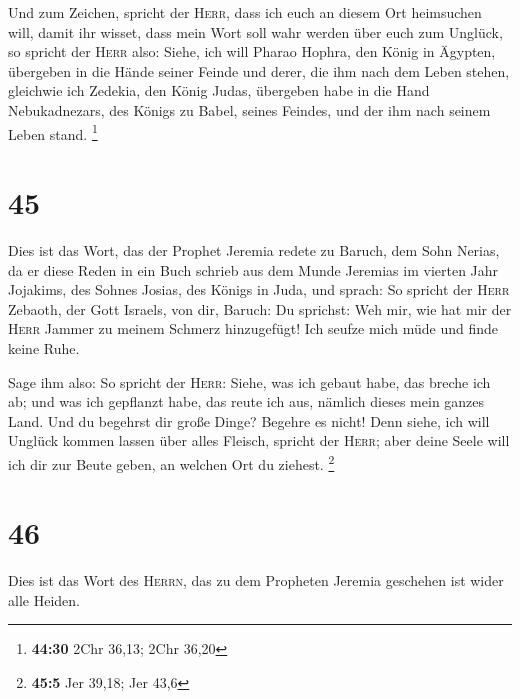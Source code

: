 Und zum Zeichen, spricht der \textsc{Herr}, dass ich
euch an diesem Ort heimsuchen will, damit ihr wisset, dass mein Wort
soll wahr werden über euch zum Unglück,  so spricht der
\textsc{Herr} also: Siehe, ich will Pharao Hophra, den König in Ägypten,
übergeben in die Hände seiner Feinde und derer, die ihm nach dem Leben
stehen, gleichwie ich Zedekia, den König Judas, übergeben habe in die
Hand Nebukadnezars, des Königs zu Babel, seines Feindes, und der ihm
nach seinem Leben stand. \footnote{\textbf{44:30} 2Chr 36,13; 2Chr 36,20}

\hypertarget{section-10}{%
\section{45}\label{section-10}}

 Dies ist das Wort, das der Prophet Jeremia redete zu
Baruch, dem Sohn Nerias, da er diese Reden in ein Buch schrieb aus dem
Munde Jeremias im vierten Jahr Jojakims, des Sohnes Josias, des Königs
in Juda, und sprach:  So spricht der \textsc{Herr}
Zebaoth, der Gott Israels, von dir, Baruch:  Du sprichst:
Weh mir, wie hat mir der \textsc{Herr} Jammer zu meinem Schmerz
hinzugefügt! Ich seufze mich müde und finde keine Ruhe.

 Sage ihm also: So spricht der \textsc{Herr}: Siehe, was
ich gebaut habe, das breche ich ab; und was ich gepflanzt habe, das
reute ich aus, nämlich dieses mein ganzes Land.  Und du
begehrst dir große Dinge? Begehre es nicht! Denn siehe, ich will Unglück
kommen lassen über alles Fleisch, spricht der \textsc{Herr}; aber deine
Seele will ich dir zur Beute geben, an welchen Ort du ziehest.
\footnote{\textbf{45:5} Jer 39,18; Jer 43,6}

\hypertarget{section-11}{%
\section{46}\label{section-11}}

 Dies ist das Wort des \textsc{Herrn}, das zu dem
Propheten Jeremia geschehen ist wider alle Heiden.

